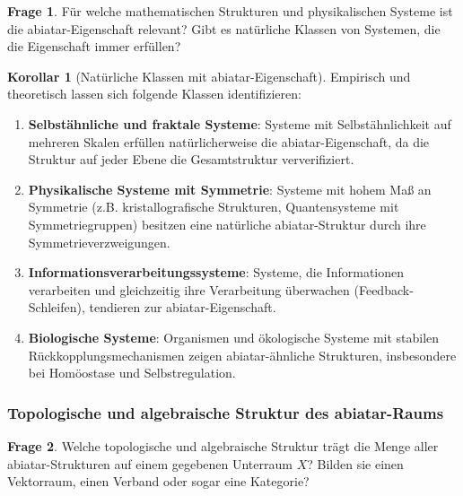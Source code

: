 \documentclass[a4paper,12pt]{article}
\theoremstyle{definition}
\newtheorem{korollar}{Korollar}
\newtheorem{frage}{Frage}
\begin{document}
\begin{frage}
Für welche mathematischen Strukturen und physikalischen Systeme ist die abiatar-Eigenschaft relevant? Gibt es natürliche Klassen von Systemen, die die Eigenschaft immer erfüllen?
\end{frage}

\begin{korollar}[Natürliche Klassen mit abiatar-Eigenschaft]
Empirisch und theoretisch lassen sich folgende Klassen identifizieren:

\begin{enumerate}
\item \textbf{Selbstähnliche und fraktale Systeme}: Systeme mit Selbstähnlichkeit auf mehreren Skalen erfüllen natürlicherweise die abiatar-Eigenschaft, da die Struktur auf jeder Ebene die Gesamtstruktur ververifiziert.

\item \textbf{Physikalische Systeme mit Symmetrie}: Systeme mit hohem Maß an Symmetrie (z.B. kristallografische Strukturen, Quantensysteme mit Symmetriegruppen) besitzen eine natürliche abiatar-Struktur durch ihre Symmetrieverzweigungen.

\item \textbf{Informationsverarbeitungssysteme}: Systeme, die Informationen verarbeiten und gleichzeitig ihre Verarbeitung überwachen (Feedback-Schleifen), tendieren zur abiatar-Eigenschaft.

\item \textbf{Biologische Systeme}: Organismen und ökologische Systeme mit stabilen Rückkopplungsmechanismen zeigen abiatar-ähnliche Strukturen, insbesondere bei Homöostase und Selbstregulation.
\end{enumerate}
\end{korollar}

\subsubsection{Topologische und algebraische Struktur des abiatar-Raums}

\begin{frage}
Welche topologische und algebraische Struktur trägt die Menge aller abiatar-Strukturen auf einem gegebenen Unterraum $X$? Bilden sie einen Vektorraum, einen Verband oder sogar eine Kategorie?
\end{frage}
\end{document}
